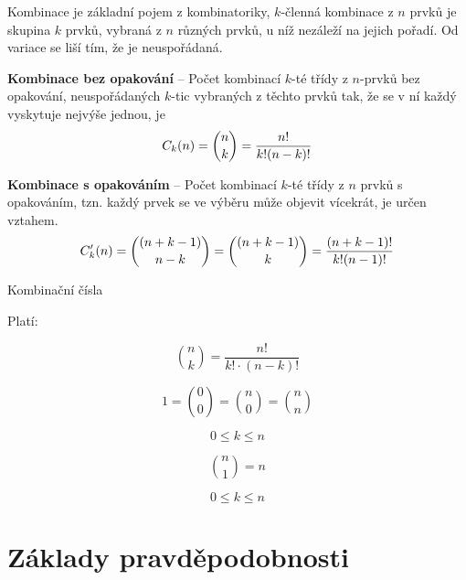 \begin{compactitem}
    \item Kombinace je základní pojem z kombinatoriky, $k$-členná kombinace z $n$ prvků je skupina $k$ prvků, vybraná z $n$ různých prvků, u níž nezáleží na jejich pořadí. Od variace se liší tím, že je neuspořádaná.

    \item \textbf{Kombinace bez opakování} -- Počet kombinací $k$-té třídy z $n$-prvků bez opakování, neuspořádaných $k$-tic vybraných z těchto prvků tak, že se v ní každý vyskytuje nejvýše jednou, je
    $$ {\displaystyle C_{k}(n)={n \choose k}={n! \over k!(n-k)!}} $$

    \item \textbf{Kombinace s opakováním} -- Počet kombinací $k$-té třídy z $n$ prvků s opakováním, tzn. každý prvek se ve výběru může objevit vícekrát, je určen vztahem.
    $$ {\displaystyle C_{k}^{\prime }(n)={{(n+k-1)} \choose n-k}={{(n+k-1)} \choose k}={(n+k-1)! \over k!(n-1)!}}$$

    \item Kombinační čísla \begin{compactitem}
        \item Platí:

        \begin{equation}
            {n \choose k} = \frac{n!}{k! \cdot (n-k)!}
        \end{equation}

        \begin{equation}
            1 = {0 \choose 0} = {n \choose 0} = {n \choose n}
        \end{equation}

        \begin{equation}
            0 \leq k \leq n
        \end{equation}

        \begin{equation}
            {n \choose 1} = n
        \end{equation}

        \begin{equation}
            0 \leq k \leq n
        \end{equation}
    \end{compactitem}
\end{compactitem}


\section{Základy pravděpodobnosti}

